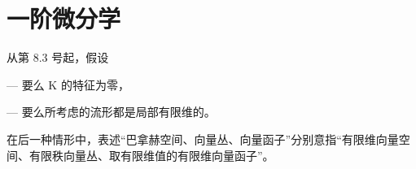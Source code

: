 \section{一阶微分学}

从第 8.3 号起，假设

--- 要么 K 的特征为零，

--- 要么所考虑的流形都是局部有限维的。

在后一种情形中，表述“巴拿赫空间、向量丛、向量函子”分别意指“有限维向量空间、有限秩向量丛、取有限维值的有限维向量函子”。


